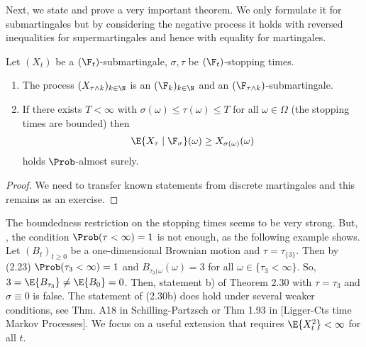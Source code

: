 Next, we state and prove a very important theorem.
We only formulate it for submartingales but by considering the negative process it holds with reversed inequalities for supermartingales and hence with equality for martingales.
\begin{thm}
Let $(X_t)$ be a $(\F_t)$-submartingale, $\sigma,\tau$ be $(\F_t)$-stopping times.
\begin{enumerate}[label=\alph*)]
\item The process $(X_{\tau \wedge k})_{k\in \N}$ is an $(\F_k)_{k\in \N}$ and an $(\F_{\tau \wedge k})$-submartingale.
\item If there exists $T<\infty$ with $\sigma(\omega)\leq \tau(\omega)\leq T$ for all $\omega \in \Omega$ (\ie the stopping times are bounded) then
\begin{align*}
\E{X_\tau\mid \F_\sigma}(\omega)\geq X_{\sigma(\omega)}(\omega)
\end{align*}
holds $\Prob$-almost surely.
\end{enumerate}
\end{thm}
\begin{proof}
We need to transfer known statements from discrete martingales and this remains as an exercise.
\end{proof}
\begin{bem}
The boundedness restriction on the stopping times seems to be very strong.
But, \eg, the condition $\Prob(\tau<\infty)=1$ is not enough, as the following example shows.
Let $(B_t)_{t\geq 0}$ be a one-dimensional Brownian motion and $\tau=\tau_{\{3\}}$. Then by (2.23) $\Prob(\tau_3<\infty)=1$ and $B_{\tau_3(\omega}(\omega)=3$ for all $\omega \in \{\tau_3<\infty\}$.
So, $3=\E{B_{\tau_3}} \not = \E{B_0}=0$.
Then, statement b) of Theorem 2.30 with $\tau=\tau_3$ and $\sigma\equiv 0$ is false.
The statement of (2.30b) does hold under several weaker conditions, see \eg Thm.  A18 in Schilling-Partzsch or Thm 1.93 in [Ligger-Cts time Markov Processes].
We focus on a useful extension that requires $\E{X_t^2}<\infty$ for all $t$.
\end{bem}

